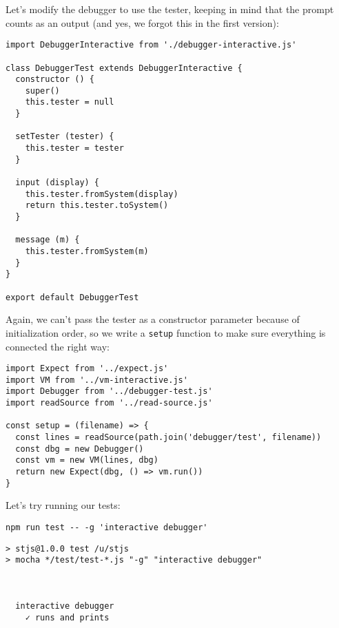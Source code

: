 \documentclass[krantzl]{krantz}
\begin{document}
Let's modify the debugger to use the tester,
keeping in mind that the prompt counts as an output
(and yes, we forgot this in the first version):


\begin{lstlisting}[frame=single,frameround=tttt]
import DebuggerInteractive from './debugger-interactive.js'

class DebuggerTest extends DebuggerInteractive {
  constructor () {
    super()
    this.tester = null
  }

  setTester (tester) {
    this.tester = tester
  }

  input (display) {
    this.tester.fromSystem(display)
    return this.tester.toSystem()
  }

  message (m) {
    this.tester.fromSystem(m)
  }
}

export default DebuggerTest
\end{lstlisting}



Again,
we can't pass the tester as a constructor parameter because of initialization order,
so we write a \texttt{setup} function to make sure everything is connected the right way:


\begin{lstlisting}[frame=single,frameround=tttt]
import Expect from '../expect.js'
import VM from '../vm-interactive.js'
import Debugger from '../debugger-test.js'
import readSource from '../read-source.js'

const setup = (filename) => {
  const lines = readSource(path.join('debugger/test', filename))
  const dbg = new Debugger()
  const vm = new VM(lines, dbg)
  return new Expect(dbg, () => vm.run())
}
\end{lstlisting}



Let's try running our tests:


\begin{lstlisting}[frame=single,frameround=tttt]
npm run test -- -g 'interactive debugger'
\end{lstlisting}



\begin{lstlisting}[frame=single,frameround=tttt]
> stjs@1.0.0 test /u/stjs
> mocha */test/test-*.js "-g" "interactive debugger"



  interactive debugger
    ✓ runs and prints
\end{lstlisting}
\end{document}
